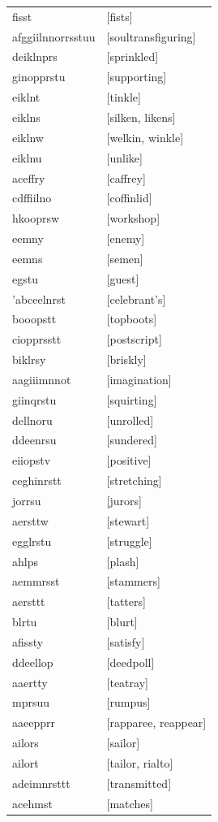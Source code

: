 \documentclass{article}
\begin{document}
\begin{tabular}{ll}
fisst & [fists] \\
afggiilnnorrsstuu & [soultransfiguring] \\
deiklnprs & [sprinkled] \\
ginopprstu & [supporting] \\
eiklnt & [tinkle] \\
eiklns & [silken, likens] \\
eiklnw & [welkin, winkle] \\
eiklnu & [unlike] \\
aceffry & [caffrey] \\
cdffiilno & [coffinlid] \\
hkooprsw & [workshop] \\
eemny & [enemy] \\
eemns & [semen] \\
egstu & [guest] \\
'abceelnrst & [celebrant's] \\
booopstt & [topboots] \\
ciopprsstt & [postscript] \\
biklrsy & [briskly] \\
aagiiimnnot & [imagination] \\
giinqrstu & [squirting] \\
dellnoru & [unrolled] \\
ddeenrsu & [sundered] \\
eiiopstv & [positive] \\
ceghinrstt & [stretching] \\
jorrsu & [jurors] \\
aersttw & [stewart] \\
egglrstu & [struggle] \\
ahlps & [plash] \\
aemmrsst & [stammers] \\
aersttt & [tatters] \\
blrtu & [blurt] \\
afissty & [satisfy] \\
ddeellop & [deedpoll] \\
aaertty & [teatray] \\
mprsuu & [rumpus] \\
aaeepprr & [rapparee, reappear] \\
ailors & [sailor] \\
ailort & [tailor, rialto] \\
adeimnrsttt & [transmitted] \\
acehmst & [matches] \\

\end{tabular}
\end{document}
